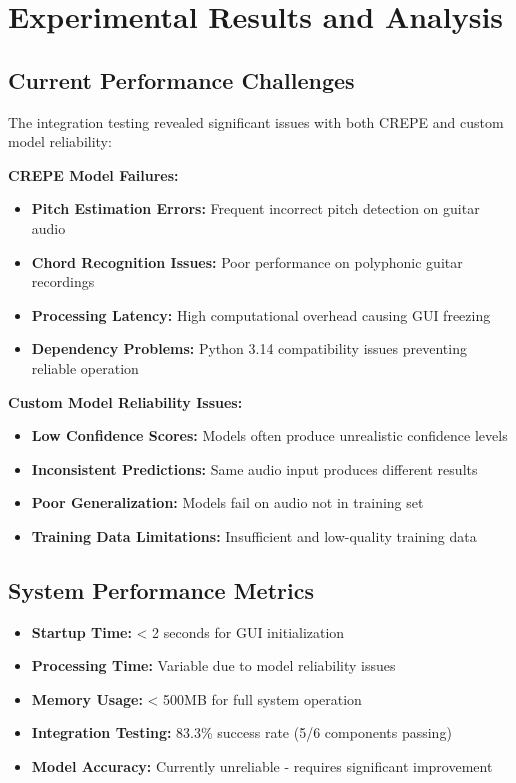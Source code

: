 \documentclass[11pt]{article}
\begin{document}
\section*{Experimental Results and Analysis}

\subsection*{Current Performance Challenges}
The integration testing revealed significant issues with both CREPE and custom model reliability:

\textbf{CREPE Model Failures:}
\begin{itemize}[leftmargin=*,itemsep=2pt]
  \item \textbf{Pitch Estimation Errors:} Frequent incorrect pitch detection on guitar audio
  \item \textbf{Chord Recognition Issues:} Poor performance on polyphonic guitar recordings
  \item \textbf{Processing Latency:} High computational overhead causing GUI freezing
  \item \textbf{Dependency Problems:} Python 3.14 compatibility issues preventing reliable operation
\end{itemize}

\textbf{Custom Model Reliability Issues:}
\begin{itemize}[leftmargin=*,itemsep=2pt]
  \item \textbf{Low Confidence Scores:} Models often produce unrealistic confidence levels
  \item \textbf{Inconsistent Predictions:} Same audio input produces different results
  \item \textbf{Poor Generalization:} Models fail on audio not in training set
  \item \textbf{Training Data Limitations:} Insufficient and low-quality training data
\end{itemize}

\subsection*{System Performance Metrics}
\begin{itemize}[leftmargin=*,itemsep=2pt]
  \item \textbf{Startup Time:} < 2 seconds for GUI initialization
  \item \textbf{Processing Time:} Variable due to model reliability issues
  \item \textbf{Memory Usage:} < 500MB for full system operation
  \item \textbf{Integration Testing:} 83.3\% success rate (5/6 components passing)
  \item \textbf{Model Accuracy:} Currently unreliable - requires significant improvement
\end{itemize}
\end{document}
